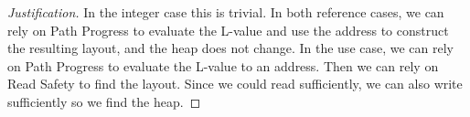 \begin{proof}[Justification]
  In the integer case this is trivial.
  In both reference cases, we can rely on Path Progress to evaluate the L-value
  and use the address to construct the resulting layout, and the heap does not change.
  In the use case, we can rely on Path Progress to evaluate the L-value to an address.
  Then we can rely on Read Safety to find the layout. Since we could read sufficiently,
  we can also write sufficiently so we find the heap.

\end{proof}
